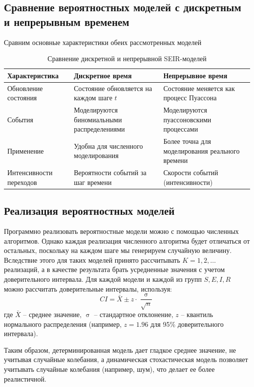 \documentclass[a4paper, 14pt]{extreport}
\renewcommand{\sigma}{\upsigma}
\begin{document}
	\subsection{Сравнение вероятностных моделей с дискретным и непрерывным временем}
	Сравним основные характеристики обеих рассмотренных моделей
	\begin{table}[h]
		\renewcommand{\arraystretch}{1}
		\begin{tabular}{|p{4cm}|p{5.5cm}|p{5.5cm}|}
			\hline
			\textbf{Характеристика} & \textbf{Дискретное время} & \textbf{Непрерывное время} \\ \hline
			Обновление состояния & Состояние обновляется на каждом шаге \( t \) & Состояние меняется как процесс Пуассона \\ \hline
			События & Моделируются биномиальными распределениями & Моделируются пуассоновскими процессами \\ \hline
			Применение & Удобна для численного моделирования & Более точна для моделирования реального времени \\ \hline
			Интенсивности переходов & Вероятности событий за шаг времени & Скорости событий (интенсивности) \\ \hline
		\end{tabular}
		\caption{Сравнение дискретной и непрерывной SEIR-моделей}
	\end{table}
	\subsection{Реализация вероятностных моделей}
	Программно реализовать вероятностные модели можно с помощью численных алгоритмов. Однако каждая реализация численного алгоритма будет отличаться от остальных, поскольку на каждом шаге мы генерируем случайную величину. Вследствие этого для таких моделей принято рассчитывать $K=1,2,\ldots$ реализаций, а в качестве результата брать усредненные значения с учетом доверительного интервала. 
	Для каждой модели и каждой из групп $S, E, I, R$ можно рассчитать доверительные интервалы, используя:
	$$
	CI = \bar{X} \pm z \cdot \frac{\sigma}{\sqrt{n}}
	$$
	где $\bar{X}$ -- среднее значение, $\sigma$ -- стандартное отклонение, $z$ -- квантиль нормального распределения (например, $z = 1.96$ для 95\% доверительного интервала).
	
	Таким образом, детерминированная модель дает гладкое среднее значение, не учитывая случайные колебания, а динамическая стохастическая модель позволяет учитывать случайные колебания (например, шум), что делает ее более реалистичной.
	
\end{document}
